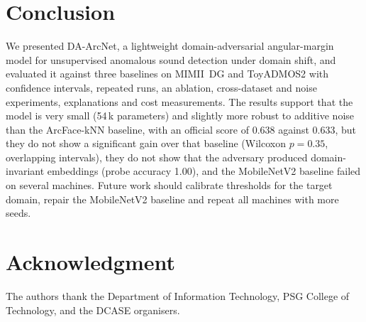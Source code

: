 \documentclass[conference]{IEEEtran}
\begin{document}
\section{Conclusion}
We presented DA-ArcNet, a lightweight domain-adversarial angular-margin model for unsupervised anomalous sound detection under domain shift, and evaluated it against three baselines on MIMII~DG and ToyADMOS2 with confidence intervals, repeated runs, an ablation, cross-dataset and noise experiments, explanations and cost measurements. The results support that the model is very small (54\,k parameters) and slightly more robust to additive noise than the ArcFace-kNN baseline, with an official score of 0.638 against 0.633, but they do not show a significant gain over that baseline (Wilcoxon $p=0.35$, overlapping intervals), they do not show that the adversary produced domain-invariant embeddings (probe accuracy 1.00), and the MobileNetV2 baseline failed on several machines. Future work should calibrate thresholds for the target domain, repair the MobileNetV2 baseline and repeat all machines with more seeds.

\section*{Acknowledgment}
The authors thank the Department of Information Technology, PSG College of Technology, and the DCASE organisers.

\clearpage


\end{document}
